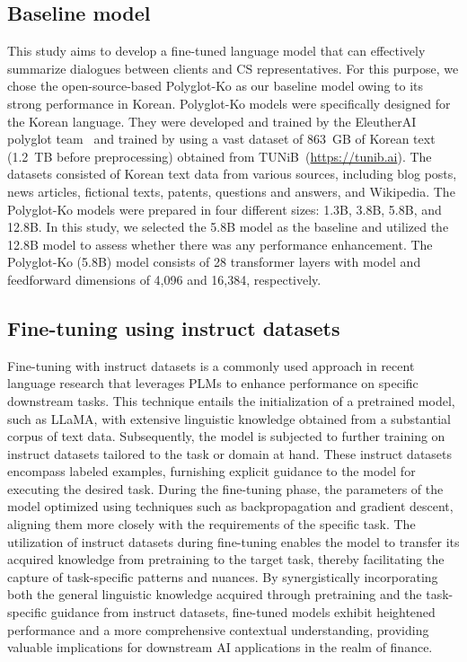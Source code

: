 \documentclass[sigconf]{acmart}
\begin{document}
\subsection{Baseline model}
This study aims to develop a fine-tuned language model that can effectively summarize dialogues between clients and CS representatives. For this purpose, we chose the open-source-based Polyglot-Ko as our baseline model owing to its strong performance in Korean. Polyglot-Ko models were specifically designed for the Korean language. They were developed and trained by the EleutherAI polyglot team~\cite{polyglot-ko:2022,polyglot-ko2023note} and trained by using a vast dataset of 863~GB of Korean text (1.2~TB before preprocessing) obtained from TUNiB~(\url{https://tunib.ai}). The datasets consisted of Korean text data from various sources, including blog posts, news articles, fictional texts, patents, questions and answers, and Wikipedia. The Polyglot-Ko models were prepared in four different sizes: 1.3B, 3.8B, 5.8B, and 12.8B. In this study, we selected the 5.8B model as the baseline and utilized the 12.8B model to assess whether there was any performance enhancement. The Polyglot-Ko (5.8B) model consists of 28 transformer layers with model and feedforward dimensions of 4,096 and 16,384, respectively.


\subsection{Fine-tuning using instruct datasets}
Fine-tuning with instruct datasets is a commonly used approach in recent language research that leverages PLMs to enhance performance on specific downstream tasks. This technique entails the initialization of a pretrained model, such as LLaMA, with extensive linguistic knowledge obtained from a substantial corpus of text data. Subsequently, the model is subjected to further training on instruct datasets tailored to the task or domain at hand. These instruct datasets encompass labeled examples, furnishing explicit guidance to the model for executing the desired task. During the fine-tuning phase, the parameters of the model optimized using techniques such as backpropagation and gradient descent, aligning them more closely with the requirements of the specific task. The utilization of instruct datasets during fine-tuning enables the model to transfer its acquired knowledge from pretraining to the target task, thereby facilitating the capture of task-specific patterns and nuances. By synergistically incorporating both the general linguistic knowledge acquired through pretraining and the task-specific guidance from instruct datasets, fine-tuned models exhibit heightened performance and a more comprehensive contextual understanding, providing valuable implications for downstream AI applications in the realm of finance.
\end{document}
